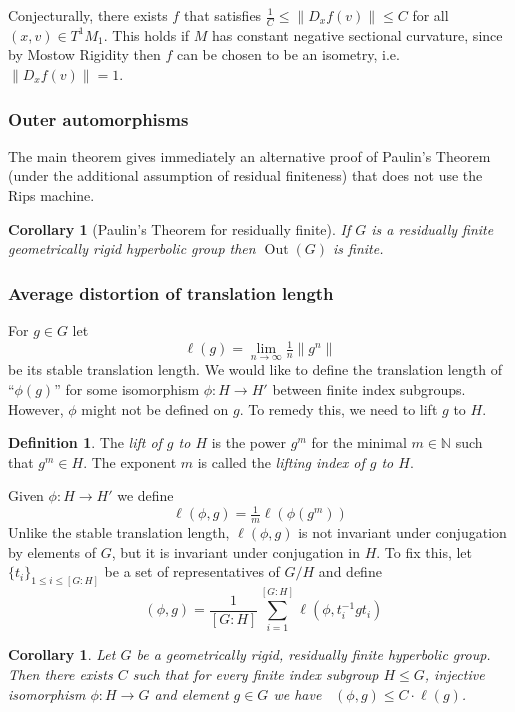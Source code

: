 \documentclass{amsart}
\numberwithin{equation}{section}
\newtheorem{corollary}[theorem]{Corollary}
\theoremstyle{definition}
\newtheorem{definition}[theorem]{Definition}
\newcommand{\bbN}{\mathbb{N}}
\newcommand{\ii}{^{-1}}
\DeclareMathOperator{\Out}{Out}
\DeclareMathOperator{\AL}{\ell_{Avg}}
\begin{document}
Conjecturally, there exists $f$ that satisfies $\tfrac 1C\le  \|D_xf(v)\|\le C$ for all $(x,v)\in T^1M_1$. 
This holds if $M$ has constant negative sectional curvature, since by Mostow Rigidity then $f$ can be chosen to be an isometry, i.e. $\|D_xf(v)\|=1$.

\subsubsection*{Outer automorphisms}

The main theorem gives immediately an alternative proof of Paulin's Theorem (under the additional assumption of residual finiteness) that does not use the Rips machine.

\begin{corollary}[Paulin's Theorem for residually finite]\label{paulin thm}
If $G$ is a  residually finite geometrically rigid hyperbolic group then $\Out(G)$ is finite.
\end{corollary}



\subsubsection*{Average distortion of translation length}
For $g\in G$ let $$\ell(g) = \lim_{n\to \infty} \tfrac1n \|g^n\|$$ be its stable translation length. We would like to define the translation length of ``$\phi(g)$'' for some isomorphism $\phi:H\to H'$ between finite index subgroups. However, $\phi$ might not be defined on $g$.
To remedy this, we need to lift $g$ to $H$. 

\begin{definition}
    The \emph{lift of $g$ to $H$} is the power $g^m$ for the minimal $m\in \bbN$ such that $g^m\in H$. The exponent $m$ is called the \emph{lifting index of $g$ to $H$}.
\end{definition}

Given $\phi:H\to H'$ we define $$\ell(\phi,g) = \tfrac 1m\ell (\phi(g^m))$$
Unlike the stable translation length, $\ell(\phi,g)$ is not invariant under conjugation by elements of $G$, but it is invariant under conjugation in $H$. 
To fix this, let $\{t_i\}_{1\le i\le[G:H]}$ be a set of representatives of $G/H$ and define  $$\AL(\phi,g) = \frac{1}{[G:H]}\sum_{i=1}^{[G:H]}\ell(\phi,t_i\ii gt_i)$$

\begin{corollary}\label{cor: AL}
    Let $G$ be a geometrically rigid, residually finite hyperbolic group. 
    Then there exists $C$ such that for every finite index subgroup $H\le G$, injective isomorphism $\phi:H\to G$ and element $g\in G$ we have $\AL(\phi,g)\le C\cdot \ell (g)$.
\end{corollary}
\end{document}
